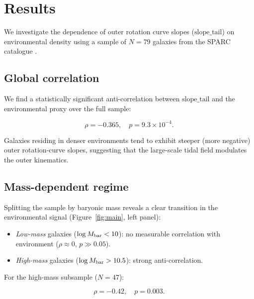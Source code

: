 \section{Results}
\label{sec:results}

We investigate the dependence of outer rotation curve slopes ($\mathrm{slope\_tail}$) on
environmental density using a sample of $N=79$ galaxies from the SPARC catalogue
\citep{Lelli2016}.

\subsection{Global correlation}
\label{sec:results:global}

We find a statistically significant anti-correlation between $\mathrm{slope\_tail}$
and the environmental proxy over the full sample:

\begin{equation}
  \rho = -0.365,\quad p = 9.3 \times 10^{-4}.
\end{equation}

Galaxies residing in denser environments tend to exhibit steeper (more negative)
outer rotation-curve slopes, suggesting that the large-scale tidal field modulates
the outer kinematics.

\subsection{Mass-dependent regime}
\label{sec:results:mass}

Splitting the sample by baryonic mass reveals a clear transition in the
environmental signal (Figure~\ref{fig:main}, left panel):

\begin{itemize}
  \item \emph{Low-mass} galaxies ($\log M_{\rm bar} < 10$): no measurable
        correlation with environment ($\rho \approx 0$, $p \gg 0.05$).
  \item \emph{High-mass} galaxies ($\log M_{\rm bar} > 10.5$): strong
        anti-correlation.
\end{itemize}

For the high-mass subsample ($N = 47$):

\begin{equation}
  \rho = -0.42,\quad p = 0.003.
\end{equation}

